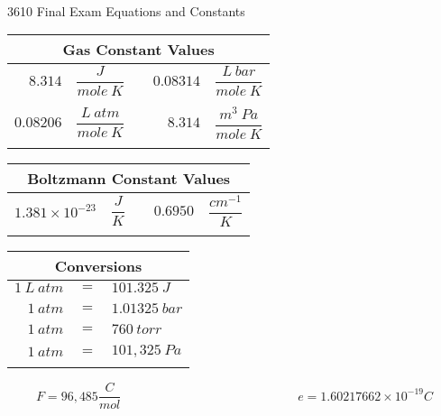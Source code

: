 \documentclass[12pt, letterpaper]{memoir}
\begin{document}
\newpage
\pagestyle{empty}

~
\vspace{-3em}
\begin{center}
	{\LARGE 3610 Final Exam Equations and Constants}	
\end{center}

\vspace{-1em}\noindent
\begin{minipage}{0.57\linewidth}
	\begin{mdframed}
		\begin{tabular}{rlcrl}
			\multicolumn{5}{c}{Gas Constant Values}\\ \midrule
			$8.314$ & $\dfrac{J}{mole~K}$ && $0.08314$ & $\dfrac{L~bar}{mole~K}$\\ \\
			$0.08206$ & $\dfrac{L~atm}{mole~K}$ && $8.314$ & $\dfrac{m^3~Pa}{mole~K}$\\ \\
		\end{tabular}
		\begin{tabular}{rlcrl}
			\multicolumn{5}{c}{Boltzmann Constant Values}\\ \midrule
			$1.381 \times 10^{-23}$ & $\dfrac{J}{K}$ && $0.6950$ & $\dfrac{cm^{-1}}{K}$\\ \\
		\end{tabular}
	\end{mdframed}
\end{minipage}
\hspace{20pt}
\begin{minipage}{0.4\linewidth}
	\begin{mdframed}
		\begin{tabular}{rcl}
			\multicolumn{3}{c}{Conversions}\\ \midrule
			$1~L~atm $ & $=$ & $101.325~J$\\ \\
			$1~atm $ & $=$ & $1.01325~bar$\\ \\
			$1~atm $ & $=$ & $760~torr$\\ \\
			$1~atm $ & $=$ & $101,325~Pa$ \\ \\
		\end{tabular}
	\end{mdframed}	
\end{minipage}

\begin{equation*}
	F=96,485\frac{C}{mol} \hspace{14em} e=1.60217662\times10^{-19} C
\end{equation*}
\end{document}
